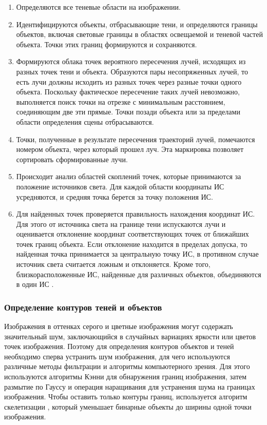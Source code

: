 \begin{enumerate}
	\item Определяются все теневые области на изображении.
	\item Идентифицируются объекты, отбрасывающие тени, и определяются границы объектов, включая световые границы в областях освещаемой и теневой частей объекта. Точки этих границ формируются и сохраняются.
	\item Формируются облака точек вероятного пересечения лучей, исходящих из разных точек тени и объекта. Образуются пары несопряженных лучей, то есть лучи должны исходить из разных точек через разные точки одного объекта. Поскольку фактическое пересечение таких лучей невозможно, выполняется поиск точки на отрезке с минимальным расстоянием, соединяющим две эти прямые. Точки позади объекта или за пределами области определения сцены отбрасываются. 
	\item Точки, полученные в результате пересечения траекторий лучей, помечаются номером объекта, через который прошел луч. Эта маркировка позволяет сортировать сформированные лучи.
	\item Происходит анализ областей скоплений точек, которые принимаются за положение источников света. Для каждой области координаты ИС усредняются, и средняя точка берется за точку положения ИС.
	\item Для найденных точек проверяется правильность нахождения координат ИС. Для этого от источника света на границе тени испускаются лучи и оценивается отклонение координат соответствующих точек от ближайших точек границ объекта. Если отклонение находится в пределах допуска, то найденная точка принимается за центральную точку ИС, в противном случае источник света считается ложным и отклоняется. Кроме того, близкорасположенные ИС, найденные для различных объектов, объединяются в один ИС \cite{sns_tras}.
\end{enumerate}

\subsubsection*{Определение контуров теней и объектов}

Изображения в оттенках серого и цветные изображения могут содержать значительный шум, заключающийся в случайных вариациях яркости или цветов точек изображения. Поэтому для определения контуров объектов и теней необходимо сперва устранить шум изображения, для чего используются различные методы фильтрации и алгоритмы компьютерного зрения. Для этого используются алгоритмы Кэнни \cite{canedgedetect} для обнаружения границ изображения, затем размытие по Гауссу \cite{gaus_smooth} и операция наращивания \cite{dilation} для устранения шума на границах изображения. Чтобы оставить только контуры границ, используется алгоритм скелетизации \cite{skeleton}, который уменьшает бинарные объекты до ширины одной точки изображения. 

